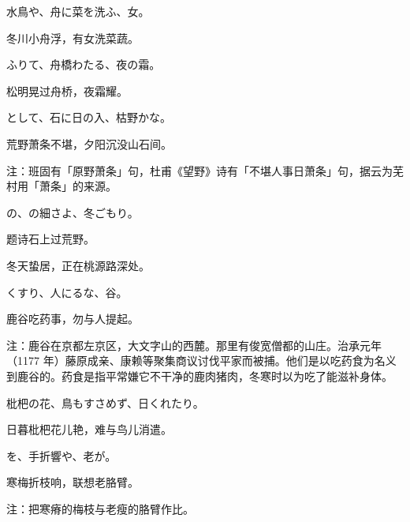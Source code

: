 \begin{haiku}
    {\FH 水鳥や、舟に菜を洗ふ、女。}

    {\FK 冬川小舟浮，有女洗菜蔬。}
\end{haiku}

\begin{haiku}
    {\FH {}ふりて、舟橋わたる、夜の霜。}

    {\FK 松明晃过舟桥，夜霜耀。}
\end{haiku}

\begin{haiku}
    {\FH {}として、石に日の入、枯野かな。}

    {\FK 荒野萧条不堪，夕阳沉没山石间。}

    {\FT 注：班固有「原野萧条」句，杜甫《望野》诗有「不堪人事日萧条」句，据云为芜村用「萧条」的来源。}
\end{haiku}

\begin{haiku}
    {\FH {}の、の細さよ、冬ごもり。}

    {\FK 题诗石上过荒野。}

    {\FK 冬天蛰居，正在桃源路深处。}
\end{haiku}

\begin{haiku}
    {\FH くすり、人にるな、谷。}

    {\FK 鹿谷吃药事，勿与人提起。}

    {\FT 注：鹿谷在京都左京区，大文字山的西麓。那里有俊宽僧都的山庄。治承元年（1177 年）藤原成亲、康赖等聚集商议讨伐平家而被捕。他们是以吃药食为名义到鹿谷的。药食是指平常嫌它不干净的鹿肉猪肉，冬寒时以为吃了能滋补身体。}
\end{haiku}

\begin{haiku}
    {\FH 枇杷の花、鳥もすさめず、日くれたり。}

    {\FK 日暮枇杷花儿艳，难与鸟儿消遣。}
\end{haiku}

\begin{haiku}
    {\FH {}を、手折響や、老が。}

    {\FK 寒梅折枝响，联想老胳臂。}

    {\FT 注：把寒瘠的梅枝与老瘦的胳臂作比。}
\end{haiku}

